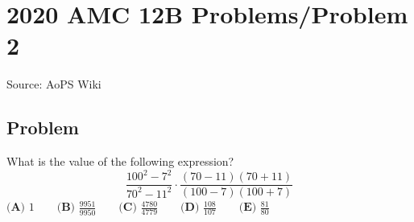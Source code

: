 \documentclass[12pt]{article}
\begin{document}
\section*{{2020 AMC 12B Problems/Problem 2}}
Source: AoPS Wiki

\subsection*{Problem}
What is the value of the following expression? \[\frac{100^2-7^2}{70^2-11^2} \cdot \frac{(70-11)(70+11)}{(100-7)(100+7)}\] $\textbf{(A) } 1 \qquad \textbf{(B) } \frac{9951}{9950} \qquad \textbf{(C) } \frac{4780}{4779} \qquad \textbf{(D) } \frac{108}{107} \qquad \textbf{(E) } \frac{81}{80}$
\end{document}
